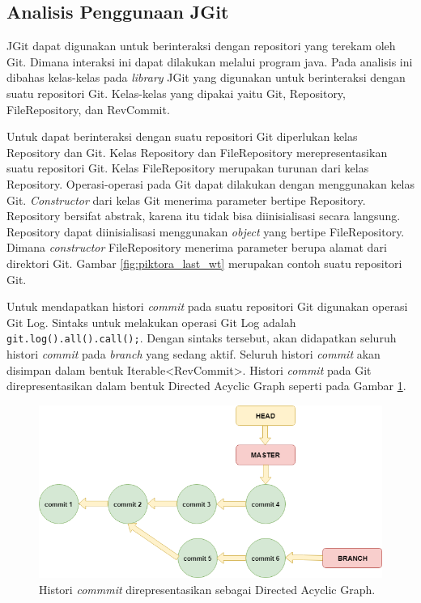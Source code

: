 \subsection{Analisis Penggunaan JGit}
\label{subsec:analisis_jgit}
JGit dapat digunakan untuk berinteraksi dengan repositori yang terekam oleh Git. Dimana interaksi ini dapat dilakukan melalui program java. Pada analisis ini dibahas kelas-kelas pada \textit{library} JGit yang digunakan untuk berinteraksi dengan suatu repositori Git. Kelas-kelas yang dipakai yaitu Git, Repository, FileRepository, dan RevCommit.

Untuk dapat berinteraksi dengan suatu repositori Git diperlukan kelas Repository dan Git. Kelas Repository dan FileRepository merepresentasikan suatu repositori Git. Kelas FileRepository merupakan turunan dari kelas Repository. Operasi-operasi pada Git dapat dilakukan dengan menggunakan kelas Git. \textit{Constructor} dari kelas Git menerima parameter bertipe Repository. Repository bersifat abstrak, karena itu tidak bisa diinisialisasi secara langsung. Repository dapat diinisialisasi menggunakan \textit{object} yang bertipe FileRepository. Dimana \textit{constructor} FileRepository menerima parameter berupa alamat dari direktori Git. Gambar \ref{fig:piktora_last_wt} merupakan contoh suatu repositori Git.

Untuk mendapatkan histori \textit{commit} pada suatu repositori Git digunakan operasi Git Log.
Sintaks untuk melakukan operasi Git Log adalah \texttt{git.log().all().call();}. Dengan sintaks tersebut, akan didapatkan seluruh histori \textit{commit} pada \textit{branch} yang sedang aktif. Seluruh histori \textit{commit} akan disimpan dalam bentuk Iterable<RevCommit>. Histori \textit{commit} pada Git direpresentasikan dalam bentuk Directed Acyclic Graph seperti pada Gambar \ref{fig:DAG}. 

\begin{figure}[H]
	\centering
		\includegraphics[scale=0.6]{Gambar/DAG.png}
	\caption{Histori \textit{commmit} direpresentasikan sebagai Directed Acyclic Graph.}
	\label{fig:DAG}
\end{figure}


